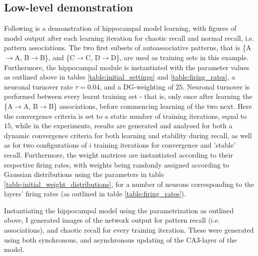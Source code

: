 \subsection{Low-level demonstration}
Following is a demonstration of hippocampal model learning, with figures of model output after each learning iteration for chaotic recall and normal recall, i.e. pattern associations. The two first subsets of autoassociative patterns, that is \{A$\rightarrow$A, B$\rightarrow$B\}, and \{C$\rightarrow$C, D$\rightarrow$D\}, are used as training sets in this example.
Furthermore, the hippocampal module is instantiated with the parameter values as outlined above in tables \ref{table:initial_settings} and \ref{table:firing_rates}, a neuronal turnover rate $\tau = 0.04$, and a DG-weighting of $25$. Neuronal turnover is performed between every learnt training set - that is, only once after learning the \{A$\rightarrow$A, B$\rightarrow$B\} associations, before commencing learning of the two next. Here the convergence criteria is set to a static number of training iterations, equal to $15$, while in the experiments, results are generated and analysed for both a dynamic convergence criteria for both learning and stability during recall, as well as for two configurations of $i$ training iterations for convergence and 'stable' recall. Furthermore, the weight matrices are instantiated according to their respective firing rates, with weights being randomly assigned according to Gaussian distributions using the parameters in table \ref{table:initial_weight_distributions}, for a number of neurons corresponding to the layers' firing rates (as outlined in table \ref{table:firing_rates}).

Instantiating the hippocampal model using the parametrization as outlined above, I generated images of the network output for pattern recall (i.e. associations), and chaotic recall for every training iteration. These were generated using both synchronous, and asynchronous updating of the CA3-layer of the model.

